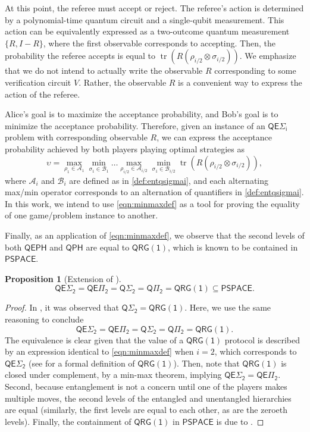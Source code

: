 \documentclass[10pt,a4paper]{article}
\newtheorem{proposition}[theorem]{Proposition}
\theoremstyle{definition}
\DeclareMathOperator{\tr}{tr}
\newcommand{\class}[1]{\ensuremath{\mathsf{#1}}\xspace}
\newcommand{\PSPACE}{\class{PSPACE}}
\newcommand{\QRGk}[1][k]{\class{QRG(#1)}}
\newcommand{\QRGone}{\QRGk[1]}
\newcommand{\QPH}{\class{QPH}}
\newcommand{\QSigmai}[1][i]{\class{Q\Sigma_{#1}}}
\newcommand{\QPii}[1][i]{\class{Q\Pi_{#1}}}
\newcommand{\QEPH}{\class{QEPH}}
\newcommand{\entQSigmai}[1][i]{\class{QE\Sigma_{#1}}}
\newcommand{\entQPii}[1][i]{\class{QE\Pi_{#1}}}
\newcommand{\calA}{\mathcal{A}}
\newcommand{\calB}{\mathcal{B}}
\begin{document}
At this point, the referee must accept or reject. 
The referee's action is determined by a polynomial-time quantum circuit and a single-qubit measurement. This action can be equivalently expressed as a two-outcome quantum measurement $\{R, I-R\}$, where the first observable corresponds to accepting. Then, the probability the referee accepts is equal to $\tr\left(R \left(\rho_{i/2} \otimes \sigma_{i/2} \right) \right)$. 
We emphasize that we do not intend to actually write the observable $R$ corresponding to some verification circuit $V$. Rather, the observable $R$ is a convenient way to express the action of the referee. 

Alice's goal is to maximize the acceptance probability, and Bob's goal is to minimize the acceptance probability. 
Therefore, given an instance of an $\entQSigmai[i]$ problem with corresponding observable $R$, 
we can express the acceptance probability achieved by both players playing optimal strategies as
\begin{equation}\label{eqn:minmaxdef}
    \upsilon = \max_{\rho_1 \in \calA_1} \min_{\sigma_1 \in \calB_1} \ldots \max_{\rho_{i/2} \in \calA_{i/2}} \min_{\sigma_1 \in \calB_{i/2}} \tr\left(R \left(\rho_{i/2} \otimes \sigma_{i/2}\right) \right),   
\end{equation}
where $\calA_i$ and $\calB_i$ are defined as in \cref{def:entqsigmai}, and each alternating max/min operator corresponds to an alternation of quantifiers in \cref{def:entqsigmai}.
In this work, we intend to use \cref{eqn:minmaxdef} as a tool for proving the equality of one game/problem instance to another.



Finally, as an application of \cref{eqn:minmaxdef}, we observe that the second levels of both $\QEPH$ and $\QPH$ are equal to $\QRGone$, which is known to be contained in $\PSPACE$.

\begin{proposition}[Extension of {\cite[Corollary 1.9]{GSSSY22_qph}}]\label{prop:second-levels-equal}
    \[
    \entQSigmai[2] = \entQPii[2] = \QSigmai[2] = \QPii[2] = \QRGone \subseteq \PSPACE.
    \]
\end{proposition}
\begin{proof}
    In \cite{GSSSY22_qph}, it was observed that $\QSigmai[2] = \QRGone$.
    Here, we use the same reasoning to conclude
    \[
        \entQSigmai[2] = \entQPii[2] = \QSigmai[2] = \QPii[2] = \QRGone .
    \]
    The equivalence is clear given that the value of a $\QRGone$ protocol is described by an expression identical to \cref{eqn:minmaxdef} when $i=2$, which corresponds to $\entQSigmai[2]$ (see \cite{jain2009parallel} for a formal definition of $\QRGone$).
    Then, note that $\QRGone$ is closed under complement, by a min-max theorem, implying $\entQSigmai[2]=\entQPii[2]$.
    Second, because entanglement is not a concern until one of the players makes multiple moves, the second levels of the entangled and unentangled hierarchies are equal (similarly, the first levels are equal to each other, as are the zeroeth levels).
    Finally, the containment of $\QRGone$ in $\PSPACE$ is due to \cite[Proposition 4]{jain2009parallel}.
\end{proof}
\end{document}
